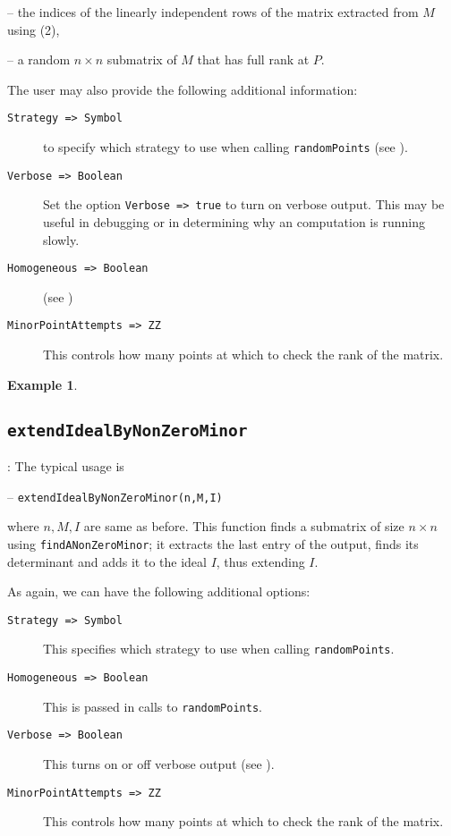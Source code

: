 \documentclass[11pt]{amsart}
\theoremstyle{definition}
\newtheorem{example}{Example}[section]
\begin{document}
	-- the indices of the linearly independent rows of the matrix extracted from $M$ using (2), 
	
	-- a random $n\times n$ submatrix of $M$ that has full rank at $P$.
	
The user may also provide the following additional information: 

\begin{description}
	\item[\tt Strategy => Symbol] to specify which strategy to use when calling {\tt randomPoints} (see ).
	
	\item[\tt Verbose => Boolean]
		 Set the option {\tt Verbose => true} to turn on verbose output.  This may be useful in debugging or in determining why an computation is running slowly.
		 
	\item[\tt Homogeneous => Boolean] (see )
	
	\item[\tt MinorPointAttempts => ZZ] 
		This controls how many points at which to check the rank of the matrix.
\end{description}

\begin{example}
	
\end{example}

\subsection{\tt extendIdealByNonZeroMinor}\label{extendIdealByNonZeroMinor}: The typical usage is 

\vspace{1em}
-- {\tt extendIdealByNonZeroMinor(n,M,I)} 

\vspace{1em}
\noindent where $n,M,I$ are same as before. This function finds a submatrix of size $n\times n$ using {\tt findANonZeroMinor};  
it extracts the last entry of the output, finds its determinant and
adds it to the ideal $I$, thus extending $I$. 


As again, we can have the following additional options:
\begin{description}
\item[\tt Strategy => Symbol] This specifies which strategy to use when calling {\tt randomPoints}.
\item[\tt Homogeneous => Boolean] This is passed in calls to {\tt randomPoints}.
\item[\tt Verbose => Boolean] This turns on or off verbose output (see ).
\item[\tt MinorPointAttempts => ZZ] This controls how many points at which to check the rank of the matrix.
\end{description}  
\end{document}
